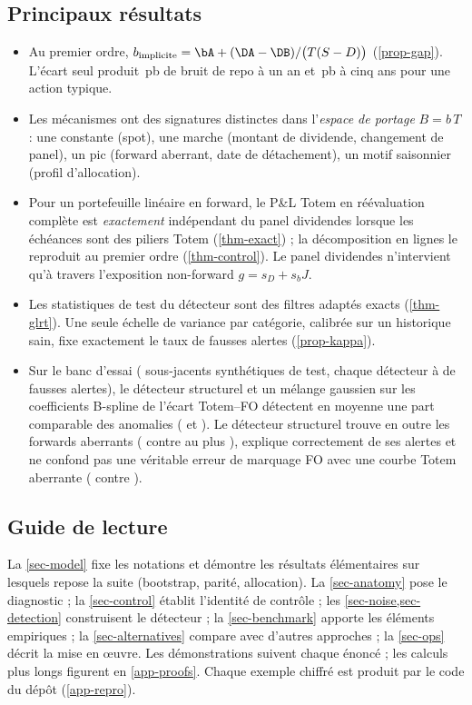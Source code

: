 \subsection{Principaux résultats}
\begin{insight}
\begin{itemize}[leftmargin=12pt]
\item Au premier ordre, $b_{\text{implicite}}=\bA+(\DA-\DB)/\bigl(T(S-D)\bigr)$ (\cref{prop-gap}). L'écart seul
produit \vGapOneY\,pb de bruit de repo à un an et \vGapFiveY\,pb à cinq ans pour une action typique.
\item Les mécanismes ont des signatures distinctes dans l'\emph{espace de portage} $B=b\,T$ : une constante (spot),
une marche (montant de dividende, changement de panel), un pic (forward aberrant, date de détachement), un motif
saisonnier (profil d'allocation).
\item Pour un portefeuille linéaire en forward, le P\&L Totem en réévaluation complète est \emph{exactement}
indépendant du panel dividendes lorsque les échéances sont des piliers Totem (\cref{thm-exact}) ; la décomposition en
lignes le reproduit au premier ordre (\cref{thm-control}). Le panel dividendes n'intervient qu'à travers
l'exposition non-forward $g=s_D+s_bJ$.
\item Les statistiques de test du détecteur sont des filtres adaptés exacts (\cref{thm-glrt}). Une seule échelle de
variance par catégorie, calibrée sur un historique sain, fixe exactement le taux de fausses alertes (\cref{prop-kappa}).
\item Sur le banc d'essai (\vNTest{} sous-jacents synthétiques de test, chaque détecteur à \vFPR{} de fausses
alertes), le détecteur structurel et un mélange gaussien sur les coefficients B-spline de l'écart Totem--FO détectent
en moyenne une part comparable des anomalies (\vMeanStruct{} et \vMeanGmmDiff). Le détecteur structurel trouve en
outre les forwards aberrants (\vFwdStruct{} contre au plus \vFwdShape), explique correctement \vAttr{} de ses alertes
et ne confond pas une véritable erreur de marquage FO avec une courbe Totem aberrante (\vFoStruct{} contre
\vFoGmmDiff).
\end{itemize}
\end{insight}

\subsection{Guide de lecture}
La \cref{sec-model} fixe les notations et démontre les résultats élémentaires sur lesquels repose la suite
(bootstrap, parité, allocation). La \cref{sec-anatomy} pose le diagnostic ; la \cref{sec-control} établit l'identité
de contrôle ; les \cref{sec-noise,sec-detection} construisent le détecteur ; la \cref{sec-benchmark} apporte les
éléments empiriques ; la \cref{sec-alternatives} compare avec d'autres approches ; la \cref{sec-ops} décrit la mise en
œuvre. Les démonstrations suivent chaque énoncé ; les calculs plus longs figurent en \cref{app-proofs}. Chaque exemple
chiffré est produit par le code du dépôt (\cref{app-repro}).
